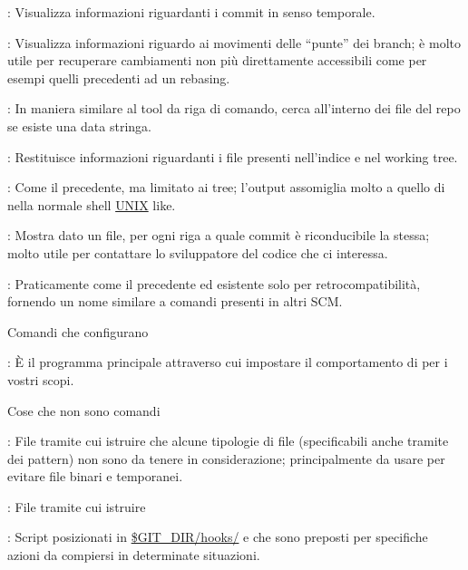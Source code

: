 \elemento{}: Visualizza informazioni riguardanti i commit in senso
temporale.

\elemento{}: Visualizza informazioni riguardo ai movimenti delle
``punte'' dei branch; \`e molto utile per recuperare cambiamenti non pi\`u
direttamente accessibili come per esempi quelli precedenti ad un rebasing.

\elemento{}: In maniera similare al tool da riga di comando, cerca
all'interno dei file del repo se esiste una data stringa.

\elemento{}: Restituisce informazioni riguardanti i file presenti
nell'indice e nel working tree.

\elemento{}: Come il precedente, ma limitato ai tree; l'output
assomiglia molto a quello di  nella normale shell \url{UNIX} like.

\elemento{}: Mostra dato un file, per ogni riga
a quale commit \`e riconducibile la stessa; molto utile per contattare lo
sviluppatore del codice che ci interessa.

\elemento{}: Praticamente come il precedente ed esistente solo per
retrocompatibilit\`a, fornendo un nome similare a comandi presenti in altri SCM.

\sezione Comandi che configurano

\elemento{}: \`E il programma principale attraverso cui impostare il
comportamento di  per i vostri scopi.

\sezione Cose che non sono comandi

\elemento{}: File tramite cui istruire  che alcune
tipologie di file (specificabili anche tramite dei pattern) non sono da tenere
in considerazione; principalmente da usare per evitare file binari e
temporanei.

\elemento{}: File tramite cui istruire 

\elemento{}: Script posizionati in \url{$GIT_DIR/hooks/} e che sono
preposti per specifiche azioni da compiersi in determinate situazioni.

